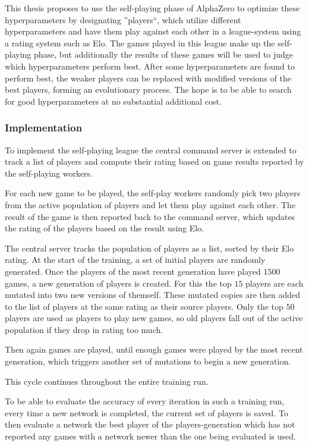 \documentclass[12pt,onecolumn,oneside,titlepage]{article}
\begin{document}
This thesis proposes to use the self-playing phase of AlphaZero to optimize these hyperparameters by designating ''players``, which utilize different hyperparameters and have them play against each other in a league-system using a rating system such as Elo. The games played 
in this league make up the self-playing phase, but additionally the results of these games will be used to judge which hyperparameters perform best. After some hyperparameters are found to perform best, the weaker players can be replaced with modified versions 
of the best players, forming an evolutionary process. The hope is to be able to search for good hyperparameters at no substantial additional cost.

\subsubsection{Implementation}

To implement the self-playing league the central command server is extended to track a list of players and compute their rating based on game results reported by the self-playing workers.

For each new game to be played, the self-play workers randomly pick two players from the active population of players and let them play against each other. The result of the game is then reported back to the command server, which updates the rating of the players based on the result using Elo.

The central server tracks the population of players as a list, sorted by their Elo rating. 
At the start of the training, a set of initial players are randomly generated.
Once the players of the most recent generation have played $1500$ games, a new generation of players is created. For this the top $15$ players are each mutated into two new versions of themself. These mutated copies are then added to the list of players at the same rating as their source players.
Only the top $50$ players are used as players to play new games, so old players fall out of the active population if they drop in rating too much.

Then again games are played, until enough games were played by the most recent generation, which triggers another set of mutations to begin a new generation.

This cycle continues throughout the entire training run.

To be able to evaluate the accuracy of every iteration in such a training run, every time a new network is completed, the current set of players is saved. 
To then evaluate a network the best player of the players-generation which has not reported any games with a network newer than the one being evaluated is used.
\end{document}
